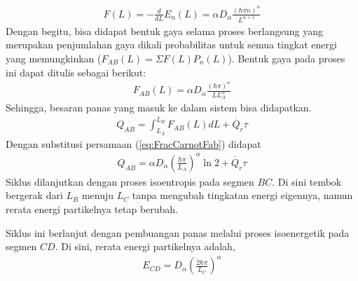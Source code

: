 \begin{align}
    F(L) = -\frac{d}{dL}E_n (L) = \alpha D_\alpha\frac{(\hbar\pi n)^\alpha}{L^{\alpha+1}}
\end{align}
Dengan begitu, bisa didapat bentuk gaya selama proses berlangsung yang merupakan penjumlahan gaya dikali probabilitas untuk semua tingkat energi yang memungkinkan (\(F_{AB}(L) = \Sigma F(L)P_n(L)\)). Bentuk gaya pada proses ini dapat ditulis sebagai berikut:
\begin{align}
    F_{AB}(L) = \alpha D_\alpha\frac{(\hbar\pi)^\alpha}{LL_A^\alpha} \label{eq:FracCarnotFab}
\end{align}
Sehingga, besaran panas yang masuk ke dalam sistem bisa didapatkan. 
\begin{align}
    Q_{AB} = \int_{L_A}^{L_B}F_{AB}(L)dL + \dot{Q_r}\tau
\end{align}
Dengan substitusi persamaan (\ref{eq:FracCarnotFab}) didapat
\begin{align}
    Q_{AB} = \alpha D_\alpha\left(\frac{\hbar\pi}{L_A}\right)^\alpha \ln{2} + \dot{Q_r}\tau \label{eq:FracCarnotQab}
\end{align}
Siklus dilanjutkan dengan proses isoentropis pada segmen \(BC\). Di sini tembok bergerak dari \(L_B\) menuju \(L_C\) tanpa mengubah tingkatan energi eigennya, namun rerata energi partikelnya tetap berubah.
\par Siklus ini berlanjut dengan pembuangan panas melalui proses isoenergetik pada segmen \(CD\). Di sini, rerata energi partikelnya adalah,
\begin{align}
    E_{CD} = D_\alpha \left(\frac{2\hbar\pi}{L_C}\right)^\alpha
\end{align}

